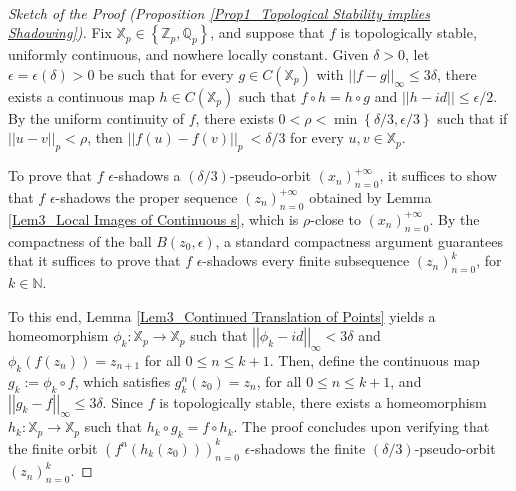 \documentclass[a4paper, 12pt]{article}
\theoremstyle{definition}
\begin{document}
	
	
	
	
	
	\paragraph{}
	
	\begin{proof}[Sketch of the Proof (Proposition \ref{Prop1_Topological Stability implies Shadowing})]
		
		Fix $\mathbb{X}_{p} \in  \left\{  \mathbb{Z}_{p}, \mathbb{Q}_{p}  \right\} $, and suppose that $f$ is topologically stable, uniformly continuous, and nowhere locally constant. 
		Given $\delta  > 0$, let $\epsilon =  \epsilon  \left(  \delta  \right)   >0$ be such that for every $g \in C \left(  \mathbb{X}_{p}  \right) $ with $ \left| \left|  f - g  \right|  \right|_{ \infty } \le 3\delta$, there exists a continuous map $h \in C \left(  \mathbb{X}_{p}  \right) $ such that $f \circ h = h \circ g$ and $ \left| \left|  h - id  \right| \right|  \le  \epsilon / 2$. 
		By the uniform continuity of $f$, there exists $ 0  < \rho  < \min \left\{  \delta /3 ,  \epsilon / 3  \right\} $ such that if $ \left| \left|  u -v  \right|  \right|_{p}  < \rho$, then $ \left| \left|  f(u) - f(v)  \right|  \right|_{p} \:< \delta /3 $ for every $u, v \in \mathbb{X}_{p}$.
		
		
		To prove that $f$ $ \epsilon $-shadows a  $ \left(  \delta / 3  \right) $-pseudo-orbit $ \left(  x_{n}   \right)_{n=0}^{+ \infty }$, it suffices to show that $f$ $ \epsilon $-shadows the proper sequence $  \left(  z_{n}   \right)_{n=0}^{+ \infty }$ obtained by Lemma \ref{Lem3_Local Images of Continuous s}, which is $\rho$-close to $ \left(  x_{n}   \right)_{n =0}^{+ \infty }$. 
		By the compactness of the ball $B \left(  z_{0},  \epsilon  \right) $, a standard compactness argument guarantees that it suffices to prove that $f$ $ \epsilon $-shadows every finite subsequence $ \left(  z_{n}   \right)_{n=0}^{k}$, for $k \in \mathbb{N} $. 
		
		To this end, Lemma \ref{Lem3_Continued Translation of Points} yields a homeomorphism $\phi_{k}: \mathbb{X}_{p} \to \mathbb{X}_{p}$ such that $  \left| \left|  \phi_{k} - id  \right|  \right|_{ \infty }  <  3 \delta$ and $\phi_{k} \left(  f \left(  z_{n}  \right)   \right)  = z_{n+1}$ for all $0 \le n \le k + 1$.
		Then, define the continuous map $g_{k} := \phi_{k} \circ f $, which satisfies $g_{k}^{n} \left(  z_{0}  \right)  = z_{n}$, for all $0 \le n \le k+1$, and $ \left| \left|  g_{k} - f  \right|  \right|_{ \infty } \le 3 \delta$. 
		Since $f$ is topologically stable, there exists a homeomorphism $h_{k}: \mathbb{X}_{p} \to \mathbb{X}_{p}$ such that $h_{k} \circ g_{k} = f \circ h_{k}$. 
		The proof concludes upon verifying that the finite orbit $  \left(  f^{n} \left(  h_{k} \left(  z_{0}  \right)   \right)    \right)_{n =0}^{k}$ $ \epsilon $-shadows the finite $(\delta/3)$-pseudo-orbit $ \left(  z_{n}   \right)_{n=0}^{k}$. 
		
	\end{proof}
	
\end{document}
